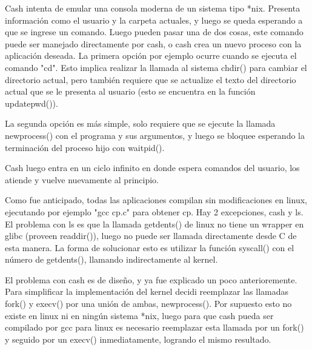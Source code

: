 Cash intenta de emular una consola moderna de un sistema tipo *nix. Presenta
información como el usuario y la carpeta actuales, y luego se queda
esperando a que se ingrese un comando. Luego pueden pasar una de dos cosas,
este comando puede ser manejado directamente por cash, o cash crea un nuevo
proceso con la aplicación deseada. La primera opción por ejemplo ocurre cuando
se ejecuta el comando "cd". Esto implica realizar la llamada al sistema chdir()
para cambiar el directorio actual, pero también requiere que se actualize el
texto del directorio actual que se le presenta al usuario (esto se encuentra en
la función updatepwd()).

La segunda opción es más simple, solo requiere que se ejecute la llamada
newprocess() con el programa y sus argumentos, y luego se bloquee esperando la
terminación del proceso hijo con waitpid().

Cash luego entra en un ciclo infinito en donde espera comandos del usuario, los
atiende y vuelve nuevamente al principio.

Como fue anticipado, todas las aplicaciones compilan sin modificaciones en
linux, ejecutando por ejemplo "gcc cp.c" para obtener cp. Hay 2 excepciones,
cash y ls. El problema con ls es que la llamada getdents() de linux no tiene un
wrapper en glibc (proveen readdir()), luego no puede ser llamada directamente
desde C de esta manera. La forma de solucionar esto es utilizar la función
syscall() con el número de getdents(), llamando indirectamente al kernel.

El problema con cash es de diseño, y ya fue explicado un poco anterioremente.
Para simplificar la implementación del kernel decidi reemplazar las llamadas
fork() y execv() por una unión de ambas, newprocess(). Por supuesto esto no
existe en linux ni en ningún sistema *nix, luego para que cash pueda ser
compilado por gcc para linux es necesario reemplazar esta llamada por un
fork() y seguido por un execv() inmediatamente, logrando el mismo resultado.
